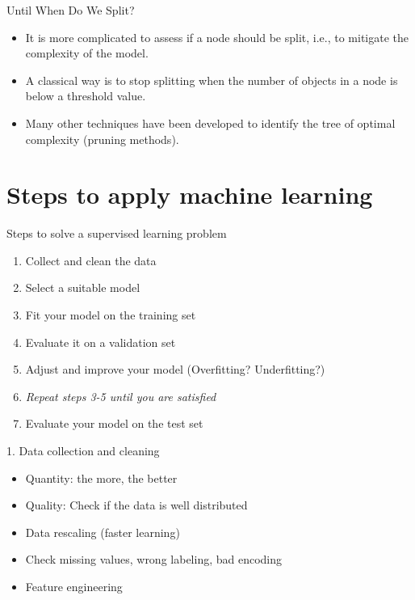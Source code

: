 \begin{frame}{Until When Do We Split?}
    \begin{itemize}
        \item It is more complicated to assess if a node should be split, i.e., to mitigate the complexity of the model.
        \item A classical way is to stop splitting when the number of objects in a node is below a threshold value.
        \item Many other techniques have been developed to identify the tree of optimal complexity (pruning methods).
    \end{itemize}
\end{frame}


\section{Steps to apply machine learning}

\begin{frame}{Steps to solve a supervised learning problem}

  \begin{enumerate}
    \item Collect and clean the data
    \item Select a suitable model
    \item Fit your model on the training set 
    \item Evaluate it on a validation set
    \item Adjust and improve your model (Overfitting? Underfitting?)
    \item \textit{Repeat steps 3-5 until you are satisfied}
    \item Evaluate your model on the test set
  \end{enumerate}
\end{frame}

\begin{frame}{1. Data collection and cleaning}
  \begin{itemize}
    \item Quantity: the more, the better
    \item Quality: Check if the data is well distributed
    \item Data rescaling (faster learning)
    \item Check missing values, wrong labeling, bad encoding
    \item Feature engineering     
  \end{itemize}
\end{frame}


